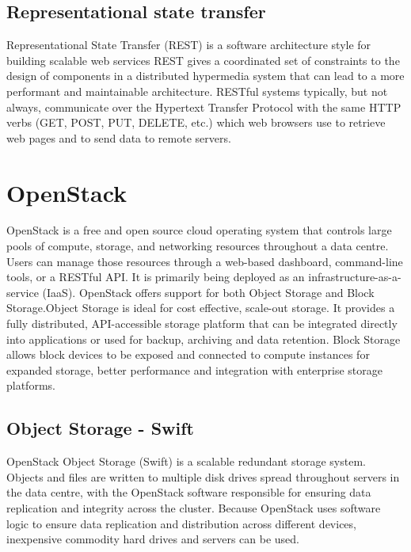   \subsection{Representational state transfer}
    Representational State Transfer (REST) is a software architecture style for building scalable web services\cite{fielding-taylor-2000} REST gives a coordinated set of constraints to the design of components in a distributed hypermedia system that can lead to a more performant and maintainable architecture\cite{fielding-2000}.
    RESTful systems typically, but not always, communicate over the Hypertext Transfer Protocol with the same HTTP verbs (GET, POST, PUT, DELETE, etc.) which web browsers use to retrieve web pages and to send data to remote servers.


\section{OpenStack}
  OpenStack\cite{openstack} is a free and open source cloud operating system that controls large pools of compute, storage, and networking resources throughout a data centre. Users can manage those resources through a web-based dashboard, command-line tools, or a RESTful API. It is primarily being deployed as an infrastructure-as-a-service (IaaS). OpenStack offers support for both Object Storage and Block Storage.Object Storage is ideal for cost effective, scale-out storage. It provides a fully distributed, API-accessible storage platform that can be integrated directly into applications or used for backup, archiving and data retention. Block Storage allows block devices to be exposed and connected to compute instances for expanded storage, better performance and integration with enterprise storage platforms.

  \subsection{Object Storage - Swift}
    OpenStack Object Storage (Swift) is a scalable redundant storage system. Objects and files are written to multiple disk drives spread throughout servers in the data centre, with the OpenStack software responsible for ensuring data replication and integrity across the cluster. Because OpenStack uses software logic to ensure data replication and distribution across different devices, inexpensive commodity hard drives and servers can be used.


